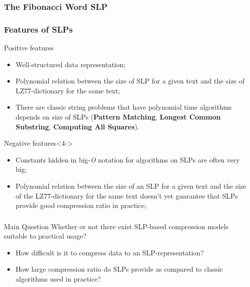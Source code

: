 \documentclass{beamer}
\begin{document}
\begin{frame}
\frametitle{The Fibonacci Word SLP}

\begin{example}
	\begin{center}
		\FibonacciWordSLP
	\end{center}
\end{example}

\end{frame}

\begin{frame}
\frametitle{Features of SLPs}

\begin{block}{Positive features}
	\begin{itemize}
	  \item<1-> Well-structured data representation;
	  \item<2-> Polynomial relation between the size of SLP for a given text and
	  the size of LZ77-dictionary for the same text;
	  \item<3-> There are classic string problems that have polynomial time
	  algorithms depends on size of SLPs (\textbf{Pattern Matching},
	  \textbf{Longest Common Substring}, \textbf{Computing All Squares}).
	\end{itemize}
\end{block}

\begin{alertblock}{Negative features}<4->
	\begin{itemize}
	  \item<4-> Constants hidden in big-\emph{O} notation for algorithms on SLPs
	  are often very big;
	  \item<5-> Polynomial relation between the size of an SLP for a given text and
	  the size of the LZ77-dictionary for the same text doesn't yet guarantee that
	  SLPs provide good compression ratio in practice;
	\end{itemize}
\end{alertblock}

\end{frame}

\begin{frame}
\frametitle{}

\begin{alertblock}{Main Question}
Whether or not there exist SLP-based compression models suitable
to practical usage?
\end{alertblock}

\pause

\begin{itemize}
  \item<2-> How difficult is it to compress data to an SLP-representation?
  \item<3-> How large compression ratio do SLPs provide as compared to classic
  algorithms used in practice?
\end{itemize}
\end{frame}
\end{document}

